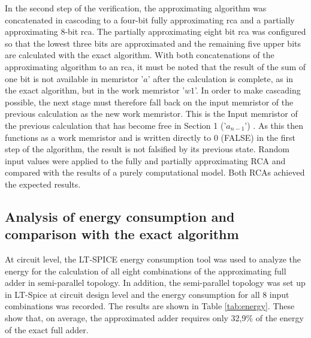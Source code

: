 \documentclass[]{IEEEtran}
\begin{document}
In the second step of the verification, the approximating algorithm was concatenated in cascoding to a four-bit fully approximating \gls{rca} and a partially approximating 8-bit \gls{rca}. The partially approximating eight bit \gls{rca} was configured so that the lowest three bits are approximated and the remaining five upper bits are calculated with the exact algorithm. With both concatenations of the approximating algorithm to an \gls{rca}, it must be noted that the result of the sum of one bit is not available in memristor '$a$' after the calculation is complete, as in the exact algorithm, but in the work memristor '$w1$'. In order to make cascading possible, the next stage must therefore fall back on the input memristor of the previous calculation as the new work memristor. This is the Input memristor of the previous calculation that has become free in Section 1 ('$a_{n-1}$') . As this then functions as a work memristor and is written directly to 0 (FALSE) in the first step of the algorithm, the result is not falsified by its previous state. Random input values were applied to the fully and partially approximating RCA and compared with the results of a purely computational model. Both RCAs achieved the expected results. 

\subsection{Analysis of energy consumption and comparison with the exact algorithm}
At circuit level, the LT-SPICE energy consumption tool was used to analyze the energy for the calculation of all eight combinations of the approximating full adder in semi-parallel topology. In addition, the semi-parallel topology \cite{} was set up in LT-Spice at circuit design level and the energy consumption for all 8 input combinations was recorded.
The results are shown in Table \ref{tab:energy}. These show that, on average, the approximated adder requires only 32,9\% of the energy of the exact full adder.
\end{document}
